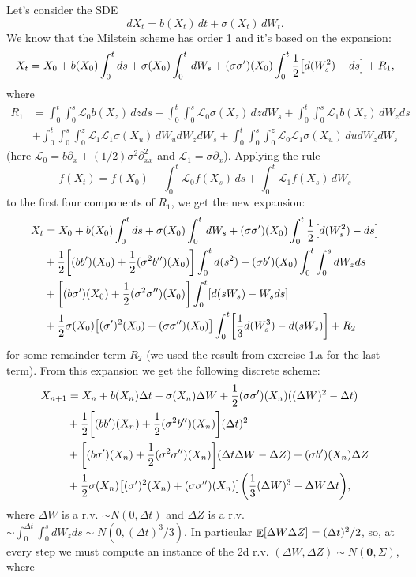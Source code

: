 \documentclass[a4paper,11pt]{article}
\theoremstyle{definition}
\theoremstyle{plain}
\theoremstyle{remark}
\DeclarePairedDelimiter{\parr}{(}{)}
\DeclarePairedDelimiter{\parq}{[}{]}
\DeclareMathOperator*{\expval}{\mathbb{E}}
\begin{document}
Let's consider the SDE
$$
dX_t = b(X_t)\,dt + \sigma(X_t)\,dW_t.
$$
We know that the Milstein scheme has order 1 and it's based on the expansion:
$$
X_t = X_0 + b(X_0)\int_0^tds + \sigma(X_0)\int_0^t\,dW_s + (\sigma\sigma')(X_0)\int_0^t\frac{1}{2}\parq*{d(W^2_s) - ds}  + R_1,
$$
where
\begin{align*}
R_1 & = \int_0^t\int_0^s\mathcal{L}_0b(X_z)\,dzds + \int_0^t\int_0^s\mathcal{L}_0\sigma(X_z)\,dzdW_s + \int_0^t\int_0^s\mathcal{L}_1b(X_z)\,dW_zds \\ &  + \int_0^t\int_0^s\int_0^z\mathcal{L}_1\mathcal{L}_1\sigma(X_u)\,dW_udW_zdW_s + \int_0^t\int_0^s\int_0^z\mathcal{L}_0\mathcal{L}_1\sigma(X_u)\,dudW_zdW_s 
\end{align*}
(here $\mathcal{L}_0=b\partial_x+(1/2)\sigma^2\partial^2_{xx}$ and $\mathcal{L}_1=\sigma\partial_x$). Applying the rule
$$
f(X_t) = f(X_0) + \int_0^t\mathcal{L}_0f(X_s)\,ds + \int_0^t\mathcal{L}_1f(X_s)\,dW_s
$$
to the first four components of $R_1$, we get the new expansion:
\begin{align*}
X_t & = X_0 + b(X_0)\int_0^tds + \sigma(X_0)\int_0^t\,dW_s + (\sigma\sigma')(X_0)\int_0^t\frac{1}{2}\parq*{d(W^2_s) - ds} \\ & + \frac{1}{2}\parq*{(bb')(X_0) + \frac{1}{2}(\sigma^2b'')(X_0)}\int_0^td(s^2) + (\sigma b')(X_0)\int_0^t\int_0^sdW_zds \\ & + \parq*{(b\sigma')(X_0) +\frac{1}{2}(\sigma^2\sigma'')(X_0)}\int_0^t\parq*{d(sW_s)-W_sds} \\ & + \frac{1}{2}\sigma(X_0)\parq*{(\sigma')^2(X_0)+(\sigma\sigma'')(X_0)}\int_0^t\parq*{\frac{1}{3}d(W_s^3)-d(sW_s)} + R_2
\end{align*}
for some remainder term $R_2$ (we used the result from exercise 1.a for the last term). From this expansion we get the following discrete scheme:
\begin{align*}
X_{n+1} & = X_n + b(X_n)\Delta t + \sigma(X_n)\Delta W + \frac{1}{2}(\sigma\sigma')(X_n)((\Delta W)^2-\Delta t) \\ & + \frac{1}{2}\parq*{(bb')(X_n) + \frac{1}{2}(\sigma^2b'')(X_n)}(\Delta t)^2 \\ & + \parq*{(b\sigma')(X_n) +\frac{1}{2}(\sigma^2\sigma'')(X_n)}(\Delta t\Delta W -\Delta Z)  + (\sigma b')(X_n)\Delta Z \\ & + \frac{1}{2}\sigma(X_n)\parq*{(\sigma')^2(X_n)+(\sigma\sigma'')(X_n)}\parr*{\frac{1}{3}(\Delta W)^3-\Delta W\Delta t},
\end{align*} 
where $\Delta W$ is a r.v. $\sim N(0,\Delta t)$ and $\Delta Z$ is a r.v. $\sim\int_0^{\Delta t}\int_0^sdW_zds\sim N(0,(\Delta t)^3/3)$. In particular $\expval\parq{\Delta W\Delta Z} = (\Delta t)^2/2$, so, at every step we must compute an instance of the 2d r.v. $(\Delta W, \Delta Z)\sim N(\mathbf{0},\Sigma)$, where
\end{document}
